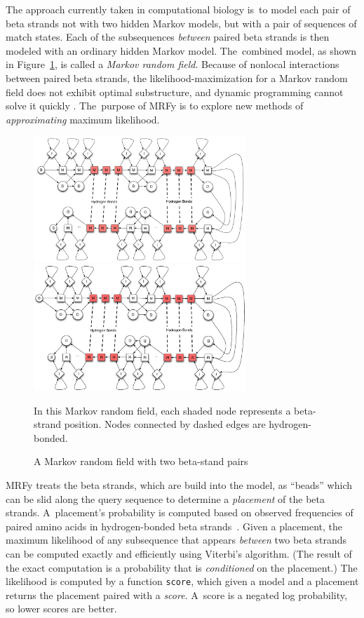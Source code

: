 \documentclass[preprint,nonatbib,blockstyle,nocopyrightspace,times]{sigplanconf}
\newcommand\figref[1]{Figure~\ref{#1}}
\let\cite\citep
\begin{document}
The approach currently taken in computational biology
is~to model each pair of beta strands not with two hidden Markov
models, 
but with a pair of sequences of match states.
Each of the subsequences \emph{between} paired beta strands is then
modeled with an ordinary hidden Markov model.
The~combined model, as shown in \figref{mrf}, is called a
\textit{Markov random field}. 
Because of nonlocal interactions between paired beta strands, 
the likelihood-maximization for a Markov random field does not
 exhibit optimal substructure, and dynamic
 programming cannot solve it quickly \cite{Menke:2010ti,Daniels:2012}.
The~purpose of MRFy is to explore new methods of \emph{approximating}
maximum likelihood.


\begin{figure}
\ifpdfmadness
\centerline{\includegraphics[width=8cm]{mrf_interleave_diagram.pdf}} 
\else
\centerline{\includegraphics[width=8cm]{mrf_interleave_diagram.eps}} 
\fi
In this Markov random field,
each shaded node represents a beta-strand position.
Nodes connected by dashed edges are hydrogen-bonded.

\caption{A Markov random field with two beta-stand pairs}
\label{mrf} 
\end{figure}



MRFy treats the beta 
strands, which are build into the model,
 as ``beads'' which can be slid along the query sequence to determine
 a \emph{placement} of the beta strands.
A~placement's probability is computed
based on observed frequencies of paired amino acids in 
hydrogen-bonded beta strands~\cite{Cowen:2002p588}.
Given a placement, the maximum likelihood of any subsequence that appears
\emph{between} two beta strands can be computed exactly and
efficiently using Viterbi's algorithm.
(The result of the exact computation is a probability that is
\emph{conditioned} on the placement.)
The likelihood is computed by a function \texttt{score},
which given a model and a {placement} returns the {placement}
paired with a \emph{score}.
A~score is a negated log probability, so lower scores are better.
\end{document}
